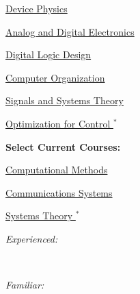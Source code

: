 \documentclass[10pt,a4paper,ragged2e,withhyper]{altacv}
\begin{document}
\begin{paracol}{2}
\begin{multicols}{2}
    \columnbreak
    
    \vspace{0.5cm}
    
    \begin{tightemize}
        \item \href{https://ece.umd.edu/course-schedule/course/ENEE313H}{Device Physics}
        \item \href{https://ece.umd.edu/course-schedule/course/ENEE303}{Analog and Digital Electronics}
        \item \href{https://ece.umd.edu/course-schedule/course/ENEE244}{Digital Logic Design}
        \item \href{https://ece.umd.edu/course-schedule/course/ENEE350}{Computer Organization}
        \item \href{https://ece.umd.edu/course-schedule/course/ENEE322}{Signals and Systems Theory}
        \item \href{https://ece.umd.edu/course-schedule/course/ENEE469O}{Optimization for Control $^*$}
    \end{tightemize}
    
    \vspace{0.375cm}
    
    \textbf{Select Current Courses:}
    \vspace{0.375cm}
    \begin{tightemize}
        \item \href{https://www-math.umd.edu/undergraduate/departmental-course-pages/offered-courses/420-amsc-460-computational-methods.html}{Computational Methods}
        \item \href{https://ece.umd.edu/course-schedule/course/ENEE420}{Communications Systems}
        \item \href{https://ece.umd.edu/course-schedule/course/ENEE660}{Systems Theory $^*$}
    \end{tightemize}
\end{multicols}

\vspace{-0.25cm}


\textit{Experienced:}

\vspace{0.125cm}

      \\

\divider

\textit{Familiar:}


\end{paracol}
\end{document}
